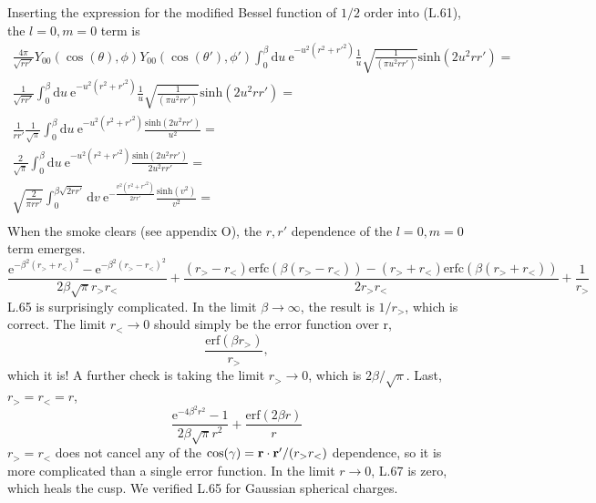 \documentclass[paper=a4, fontsize=11pt]{article} %
\numberwithin{equation}{section} %
\numberwithin{figure}{section} %
\numberwithin{table}{section} %
\newcommand{\br}{{\bf{r}}}
\newcommand{\re}{{\mathrm{e}}}
\newcommand{\rerf}{{\mathrm{erf}}}
\newcommand{\rerfc}{{\mathrm{erfc}}}
\newcommand{\rd}{{\mathrm{d}}}
\begin{document}
Inserting the expression for the modified Bessel function of $1/2$ order into (L.61), the $l=0, m=0$ term is
\begin{equation}
\begin{split}
\frac{4\pi}{\sqrt{r r'}} Y_{00}\left(\cos(\theta),\phi\right)Y_{00}\left(\cos(\theta'),\phi'\right) \int_{0}^\beta \rd u\ \re^{-u^2(r^2 + r'^2)} \frac{1}{u}\sqrt{\frac{1}{(\pi u^2 r r')}} \mathrm{sinh}(2 u^2 r r') =\\
\frac{1}{\sqrt{r r'}} \int_{0}^\beta \rd u\ \re^{-u^2(r^2 + r'^2)} \frac{1}{u}\sqrt{\frac{1}{(\pi u^2 r r')}} \mathrm{sinh}(2 u^2 r r') =\\
\frac{1}{r r'} \frac{1}{\sqrt{\pi}} \int_{0}^\beta \rd u\ \re^{-u^2(r^2 + r'^2)} \frac{\mathrm{sinh}(2 u^2 r r')}{u^2}  =\\
\frac{2}{\sqrt{\pi}} \int_{0}^\beta \rd u\ \re^{-u^2(r^2 + r'^2)} \frac{\mathrm{sinh}(2 u^2 r r')}{2u^2 r r'}  =\\
\sqrt{\frac{2}{\pi r r'}} \int_{0}^{\beta\sqrt{2r r'}} \rd v\ \re^{-\frac{v^2(r^2 + r'^2)}{2r r'}} \frac{\mathrm{sinh}(v^2)}{v^2}  =\\
\end{split}
\end{equation}
When the smoke clears (see appendix O), the $r, r'$ dependence of the $l=0, m=0$ term emerges.
\begin{equation}
\frac{\re^{-\beta^2(r_>+r_<)^2 }-\re^{-\beta^2(r_>-r_<)^2 }}{2\beta \sqrt{\pi}r_> r_< } + \frac{(r_> - r_<)\rerfc\left(\beta(r_> - r_<)\right) - (r_> + r_<)\rerfc\left(\beta(r_> + r_<)\right)}{2 r_>r_<} + \frac{1}{r_>}
\end{equation}
L.65 is surprisingly complicated. In the limit $\beta \rightarrow \infty$, the result is $1/r_>$, which is correct. The limit $r_< \rightarrow 0$ should simply be the error function over r,
\begin{equation}
\frac{\rerf(\beta r_>)}{r_>},
\end{equation}
which it is! A further check is taking the limit $r_> \rightarrow 0$, which is $2\beta/\sqrt{\pi}$. Last, $r_> = r_< = r$, 
\begin{equation}
\frac{\re^{-4\beta^2r^2} - 1}{2\beta\sqrt{\pi}r^2} + \frac{\rerf\left(2\beta r\right)}{r}
\end{equation}
$r_> = r_< $ does not cancel any of the $\cos(\gamma) = \br \cdot \br'/(r_> r_<)$ dependence, so it is more complicated than a single error function. In the limit $r \rightarrow 0$, L.67 is zero, which heals the cusp. We verified L.65 for Gaussian spherical charges.\\
\end{document}
